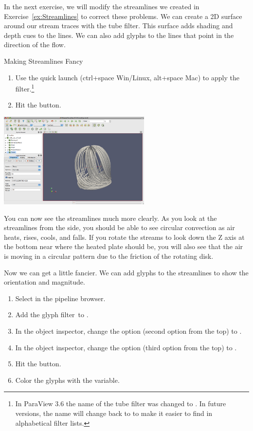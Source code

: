 In the next exercise, we will modify the streamlines we created in
Exercise~\ref{ex:Streamlines} to correct these problems.  We can create a
2D surface around our stream traces with the tube filter.  This surface
adds shading and depth cues to the lines.  We can also add glyphs to the
lines that point in the direction of the flow.

\begin{exercise}{Making Streamlines Fancy}
  \label{ex:MakingStreamlinesFancy}%
  \begin{enumerate}
  \item Use the quick launch (ctrl+space Win/Linux, alt+space Mac) to apply
    the  filter.\footnote{In ParaView 3.6 the name of
      the tube filter was changed to .  In future versions, the name will change back to
       to make it easier to find in alphabetical filter lists.}
  \item Hit the \apply button.
    \savecounter
  \end{enumerate}

  \begin{inlinefig}
    \includegraphics[width=3in]{images/StreamTracer1}
  \end{inlinefig}

  You can now see the streamlines much more clearly.  As you look at the
  streamlines from the side, you should be able to see circular convection
  as air heats, rises, cools, and falls.  If you rotate the streams to look
  down the Z axis at the bottom near where the heated plate should be, you
  will also see that the air is moving in a circular pattern due to the
  friction of the rotating disk.

  Now we can get a little fancier.  We can add glyphs to the streamlines to
  show the orientation and magnitude.

  \begin{enumerate}
    \restorecounter
  \item Select  in the pipeline browser.
  \item Add the glyph filter~\glyph to .
  \item In the object inspector, change the  option (second
    option from the top) to .
  \item In the object inspector, change the  option (third
    option from the top) to .
  \item Hit the \apply button.
  \item Color the glyphs with the  variable.
  \end{enumerate}


\end{exercise}
